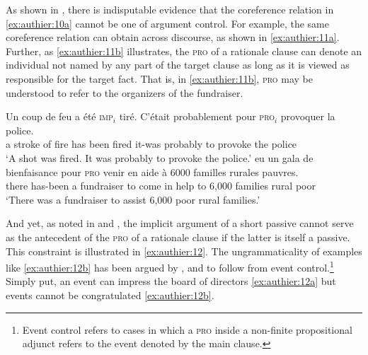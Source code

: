 \documentclass[output=paper,colorlinks,citecolor=brown]{langscibook}
\begin{document}
As shown in \citet{williams2017a}, there is indisputable evidence that the coreference relation in \ref{ex:authier:10a} cannot be one of argument control. For example, the same coreference relation can obtain across discourse, as shown in \ref{ex:authier:11a}. Further, as \ref{ex:authier:11b} illustrates, the \textsc{pro} of a rationale clause can denote an individual not named by any part of the target clause as long as it is viewed as responsible for the target fact. That is, in \ref{ex:authier:11b}, \textsc{pro} may be understood to refer to the organizers of the fundraiser.

\begin{exe} 
    \ex\label{ex:authier:11} 
    \begin{xlist}
        \ex\label{ex:authier:11a}
            \gll Un coup   de feu  a    été \textsc{imp}$_{i}$ tiré.  C’était probablement pour \textsc{pro}$_{i}$ provoquer la   police. \\   %
            a    stroke of fire has been       {} fired it-was  probably to {} provoke the police\\ 
            \glt `A shot was fired. It was probably to provoke the police.'%
        \ex\label{ex:authier:11b}
             eu  un {gala de bienfaisance} pour \textsc{pro} venir en aide à 6000 familles rurales pauvres. \\
                   there has-been a fundraiser to {} come in help to 6,000 families rural    poor\\
            \glt `There was a fundraiser to assist 6,000 poor rural families.'
    \end{xlist}
\end{exe}

And yet, as noted in \citet{jaeggli1986a} and \citet{landau2000a}, the implicit argument of a short passive cannot serve as the antecedent of the \textsc{pro} of a rationale clause if the latter is itself a passive. This constraint is illustrated in \ref{ex:authier:12}. The ungrammaticality of examples like \ref{ex:authier:12b} has been argued by \citet[310]{williams1985a}, \citet[9--16]{lasnik1988a} and \citet[318--321]{reed2014a} to follow from event control.\footnote{Event control refers to cases in which a \textsc{pro} inside a non-finite propositional adjunct refers to the event denoted by the main clause.} Simply put, an event can impress the board of directors \ref{ex:authier:12a} but events cannot be congratulated \ref{ex:authier:12b}. 
\end{document}
